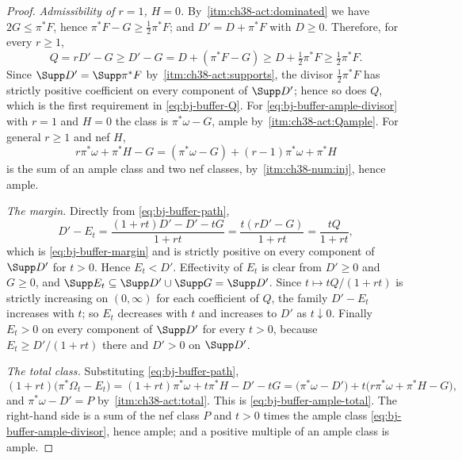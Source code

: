 \begin{proof}
\emph{Admissibility of $r=1$, $H=0$.}  By
\,\cref{itm:ch38-act:dominated} we have
$2G\leq\pi^*F$, hence $\pi^*F-G\geq\tfrac12\pi^*F$; and
$D'=D+\pi^*F$ with $D\geq0$.  Therefore, for every $r\geq1$,
\[
 Q=rD'-G\geq D'-G=D+(\pi^*F-G)\geq D+\tfrac12\pi^*F
 \geq\tfrac12\pi^*F .
\]
Since $\Supp D'=\Supp\pi^*F$ by
\,\cref{itm:ch38-act:supports}, the divisor
$\tfrac12\pi^*F$ has strictly positive coefficient on every component of
$\Supp D'$; hence so does $Q$, which is the first requirement in
\eqref{eq:bj-buffer-Q}.  For \eqref{eq:bj-buffer-ample-divisor} with
$r=1$ and $H=0$ the class is $\pi^*\omega-G$, ample by
\,\cref{itm:ch38-act:Qample}.  For general
$r\geq1$ and nef $H$,
\[
 r\pi^*\omega+\pi^*H-G=(\pi^*\omega-G)+(r-1)\pi^*\omega+\pi^*H
\]
is the sum of an ample class and two nef classes, by
\,\cref{itm:ch38-num:inj}, hence ample.

\emph{The margin.}  Directly from \eqref{eq:bj-buffer-path},
\[
 D'-E_t=\frac{(1+rt)D'-D'-tG}{1+rt}=\frac{t(rD'-G)}{1+rt}
 =\frac{tQ}{1+rt},
\]
which is \eqref{eq:bj-buffer-margin} and is strictly positive on every
component of $\Supp D'$ for $t>0$.  Hence $E_t<D'$.  Effectivity of
$E_t$ is clear from $D'\geq0$ and $G\geq0$, and
$\Supp E_t\subseteq\Supp D'\cup\Supp G=\Supp D'$.  Since
$t\mapsto tQ/(1+rt)$ is strictly increasing on $(0,\infty)$ for each
coefficient of $Q$, the family $D'-E_t$ increases with $t$; so
$E_t$ decreases with $t$ and increases to $D'$ as $t\downarrow0$.
Finally $E_t>0$ on every component of $\Supp D'$ for every $t>0$,
because $E_t\geq D'/(1+rt)$ there and $D'>0$ on
$\Supp D'$.

\emph{The total class.}  Substituting \eqref{eq:bj-buffer-path},
\[
 (1+rt)\bigl(\pi^*\Omega_t-E_t\bigr)
 =(1+rt)\pi^*\omega+t\pi^*H-D'-tG
 =\bigl(\pi^*\omega-D'\bigr)+t\bigl(r\pi^*\omega+\pi^*H-G\bigr),
\]
and $\pi^*\omega-D'=P$ by
\,\cref{itm:ch38-act:total}.  This is
\eqref{eq:bj-buffer-ample-total}.  The right-hand side is a sum of the nef
class $P$ and $t>0$ times the ample class
\eqref{eq:bj-buffer-ample-divisor}, hence ample; and a positive multiple of
an ample class is ample.
\end{proof}

